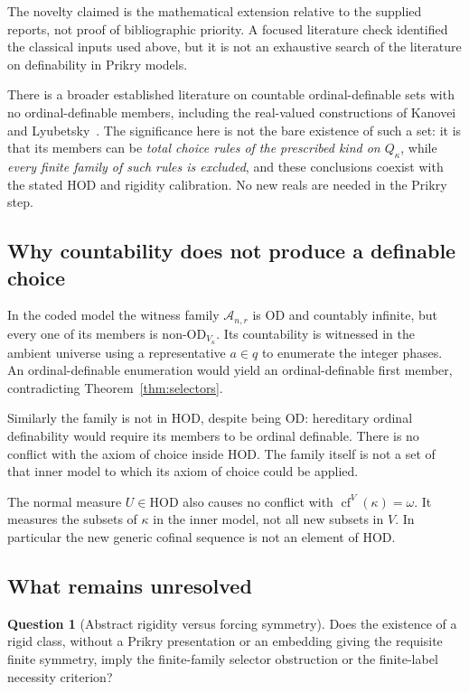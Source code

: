 \documentclass[11pt,letterpaper]{article}
\theoremstyle{definition}
\newtheorem{question}[definition]{Question}
\numberwithin{equation}{section}
\newcommand{\HOD}{\mathrm{HOD}}
\newcommand{\OD}{\mathrm{OD}}
\newcommand{\cf}{\operatorname{cf}}
\begin{document}
The novelty claimed is the mathematical extension relative to the supplied reports, not proof of bibliographic priority. A focused literature check identified the classical inputs used above, but it is not an exhaustive search of the literature on definability in Prikry models.

There is a broader established literature on countable ordinal-definable sets with no ordinal-definable members, including the real-valued constructions of Kanovei and Lyubetsky~\cite{kanovei-lyubetsky}. The significance here is not the bare existence of such a set: it is that its members can be \emph{total choice rules of the prescribed kind on $Q_\kappa$}, while \emph{every finite family of such rules is excluded}, and these conclusions coexist with the stated HOD and rigidity calibration. No new reals are needed in the Prikry step.

\subsection{Why countability does not produce a definable choice}

In the coded model the witness family $\mathcal A_{n,r}$ is $\OD$ and countably infinite, but every one of its members is non-$\OD_{V_\kappa}$. Its countability is witnessed in the ambient universe using a representative $a\in q$ to enumerate the integer phases. An ordinal-definable enumeration would yield an ordinal-definable first member, contradicting Theorem~\ref{thm:selectors}.

Similarly the family is not in $\HOD$, despite being $\OD$: hereditary ordinal definability would require its members to be ordinal definable. There is no conflict with the axiom of choice inside $\HOD$. The family itself is not a set of that inner model to which its axiom of choice could be applied.

The normal measure $U\in\HOD$ also causes no conflict with $\cf^V(\kappa)=\omega$. It measures the subsets of $\kappa$ in the inner model, not all new subsets in $V$. In particular the new generic cofinal sequence is not an element of $\HOD$.

\subsection{What remains unresolved}

\begin{question}[Abstract rigidity versus forcing symmetry]
Does the existence of a rigid class, without a Prikry presentation or an embedding giving the requisite finite symmetry, imply the finite-family selector obstruction or the finite-label necessity criterion?
\end{question}
\end{document}
